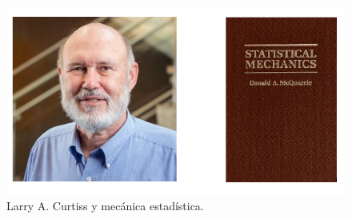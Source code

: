 \documentclass{beamer}
\begin{document}
\begin{frame}[fragile]
\begin{figure}
\includegraphics[scale=.7]{images/Curtis.png}
\caption{Larry A. Curtiss y mecánica estadística.}
\end{figure}

\end{frame}
\end{document}

